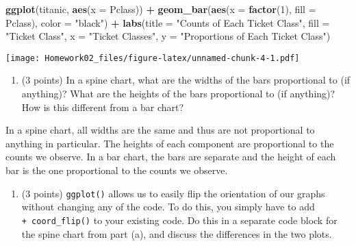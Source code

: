 \documentclass[]{article}
\newenvironment{Shaded}{\begin{snugshade}}{\end{snugshade}}
\newcommand{\DataTypeTok}[1]{\textcolor[rgb]{0.13,0.29,0.53}{#1}}
\newcommand{\DecValTok}[1]{\textcolor[rgb]{0.00,0.00,0.81}{#1}}
\newcommand{\KeywordTok}[1]{\textcolor[rgb]{0.13,0.29,0.53}{\textbf{#1}}}
\newcommand{\NormalTok}[1]{#1}
\newcommand{\OperatorTok}[1]{\textcolor[rgb]{0.81,0.36,0.00}{\textbf{#1}}}
\newcommand{\StringTok}[1]{\textcolor[rgb]{0.31,0.60,0.02}{#1}}
\providecommand{\tightlist}{%
  \setlength{\itemsep}{0pt}\setlength{\parskip}{0pt}}
\begin{document}
\begin{Shaded}
\begin{Highlighting}[]
\KeywordTok{ggplot}\NormalTok{(titanic, }\KeywordTok{aes}\NormalTok{(}\DataTypeTok{x =}\NormalTok{ Pclass)) }\OperatorTok{+}
\StringTok{    }\KeywordTok{geom_bar}\NormalTok{(}\KeywordTok{aes}\NormalTok{(}\DataTypeTok{x =} \KeywordTok{factor}\NormalTok{(}\DecValTok{1}\NormalTok{), }\DataTypeTok{fill =}\NormalTok{ Pclass), }\DataTypeTok{color =} \StringTok{"black"}\NormalTok{) }\OperatorTok{+}
\StringTok{    }\KeywordTok{labs}\NormalTok{(}\DataTypeTok{title =} \StringTok{"Counts of Each Ticket Class"}\NormalTok{,}
         \DataTypeTok{fill =} \StringTok{"Ticket Class"}\NormalTok{,}
         \DataTypeTok{x =} \StringTok{"Ticket Classes"}\NormalTok{,}
         \DataTypeTok{y =} \StringTok{"Proportions of Each Ticket Class"}\NormalTok{)}
\end{Highlighting}
\end{Shaded}

\texttt{[image: Homework02\_files/figure-latex/unnamed-chunk-4-1.pdf]}

\begin{enumerate}
\def\labelenumi{\alph{enumi}.}
\setcounter{enumi}{1}
\tightlist
\item
  (3 points) In a spine chart, what are the widths of the bars
  proportional to (if anything)? What are the heights of the bars
  proportional to (if anything)? How is this different from a bar chart?
\end{enumerate}

In a spine chart, all widths are the same and thus are not proportional
to anything in particular. The heights of each component are
proportional to the counts we observe. In a bar chart, the bars are
separate and the height of each bar is the one proportional to the
counts we observe.

\begin{enumerate}
\def\labelenumi{\alph{enumi}.}
\setcounter{enumi}{2}
\tightlist
\item
  (3 points) \texttt{ggplot()} allows us to easily flip the orientation
  of our graphs without changing any of the code. To do this, you simply
  have to add \texttt{+\ coord\_flip()} to your existing code. Do this
  in a separate code block for the spine chart from part (a), and
  discuss the differences in the two plots.
\end{enumerate}
\end{document}
